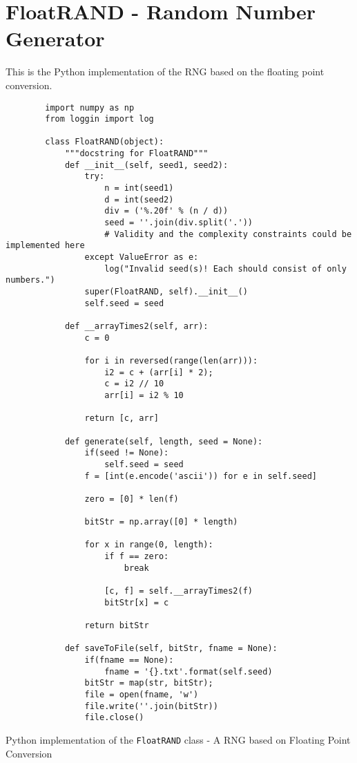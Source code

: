 \chapter{FloatRAND - Random Number Generator}

This is the Python implementation of the RNG based on the floating point conversion.

\begin{code}
    \begin{verbatim}
        import numpy as np
        from loggin import log
        
        class FloatRAND(object):
        	"""docstring for FloatRAND"""
        	def __init__(self, seed1, seed2):
        		try:
        			n = int(seed1)
        			d = int(seed2)
        			div = ('%.20f' % (n / d))
        			seed = ''.join(div.split('.'))
        			# Validity and the complexity constraints could be implemented here
        		except ValueError as e:
        			log("Invalid seed(s)! Each should consist of only numbers.")
        		super(FloatRAND, self).__init__()
        		self.seed = seed
        
        	def __arrayTimes2(self, arr):
        		c = 0
        
        		for i in reversed(range(len(arr))):
        			i2 = c + (arr[i] * 2);
        			c = i2 // 10
        			arr[i] = i2 % 10
        
        		return [c, arr]
        
        	def generate(self, length, seed = None):
        		if(seed != None):
        			self.seed = seed
        		f = [int(e.encode('ascii')) for e in self.seed]
        
        		zero = [0] * len(f)
        
        		bitStr = np.array([0] * length)
        
        		for x in range(0, length):
        			if f == zero:
        				break
        
        			[c, f] = self.__arrayTimes2(f)
        			bitStr[x] = c
        
        		return bitStr
        
        	def saveToFile(self, bitStr, fname = None):
        		if(fname == None):
        			fname = '{}.txt'.format(self.seed)
        		bitStr = map(str, bitStr);
        		file = open(fname, 'w')
        		file.write(''.join(bitStr))
        		file.close()
    \end{verbatim}
    \caption{Python implementation of the \texttt{FloatRAND} class - A RNG based on Floating Point Conversion}
    \label{lst:py_class_float}
\end{code}